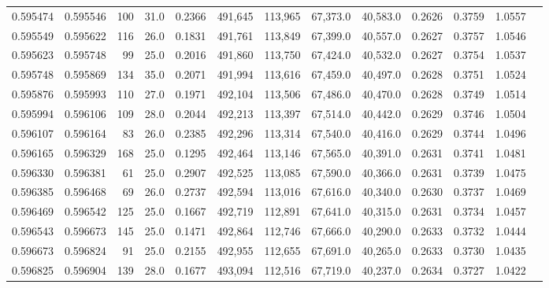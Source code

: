 \begin{tabular}{rrrrrrrrrrrrr}
0.595474 & 0.595546 &   100 & 31.0 &                                     0.2366 & 491,645 & 113,965 &  67,373.0 &  40,583.0 & 0.2626 & 0.3759 & 1.0557 \\
0.595549 & 0.595622 &   116 & 26.0 &                                     0.1831 & 491,761 & 113,849 &  67,399.0 &  40,557.0 & 0.2627 & 0.3757 & 1.0546 \\
0.595623 & 0.595748 &    99 & 25.0 &                                     0.2016 & 491,860 & 113,750 &  67,424.0 &  40,532.0 & 0.2627 & 0.3754 & 1.0537 \\
0.595748 & 0.595869 &   134 & 35.0 &                                     0.2071 & 491,994 & 113,616 &  67,459.0 &  40,497.0 & 0.2628 & 0.3751 & 1.0524 \\
0.595876 & 0.595993 &   110 & 27.0 &                                     0.1971 & 492,104 & 113,506 &  67,486.0 &  40,470.0 & 0.2628 & 0.3749 & 1.0514 \\
0.595994 & 0.596106 &   109 & 28.0 &                                     0.2044 & 492,213 & 113,397 &  67,514.0 &  40,442.0 & 0.2629 & 0.3746 & 1.0504 \\
0.596107 & 0.596164 &    83 & 26.0 &                                     0.2385 & 492,296 & 113,314 &  67,540.0 &  40,416.0 & 0.2629 & 0.3744 & 1.0496 \\
0.596165 & 0.596329 &   168 & 25.0 &                                     0.1295 & 492,464 & 113,146 &  67,565.0 &  40,391.0 & 0.2631 & 0.3741 & 1.0481 \\
0.596330 & 0.596381 &    61 & 25.0 &                                     0.2907 & 492,525 & 113,085 &  67,590.0 &  40,366.0 & 0.2631 & 0.3739 & 1.0475 \\
0.596385 & 0.596468 &    69 & 26.0 &                                     0.2737 & 492,594 & 113,016 &  67,616.0 &  40,340.0 & 0.2630 & 0.3737 & 1.0469 \\
0.596469 & 0.596542 &   125 & 25.0 &                                     0.1667 & 492,719 & 112,891 &  67,641.0 &  40,315.0 & 0.2631 & 0.3734 & 1.0457 \\
0.596543 & 0.596673 &   145 & 25.0 &                                     0.1471 & 492,864 & 112,746 &  67,666.0 &  40,290.0 & 0.2633 & 0.3732 & 1.0444 \\
0.596673 & 0.596824 &    91 & 25.0 &                                     0.2155 & 492,955 & 112,655 &  67,691.0 &  40,265.0 & 0.2633 & 0.3730 & 1.0435 \\
0.596825 & 0.596904 &   139 & 28.0 &                                     0.1677 & 493,094 & 112,516 &  67,719.0 &  40,237.0 & 0.2634 & 0.3727 & 1.0422 \\

\end{tabular}
